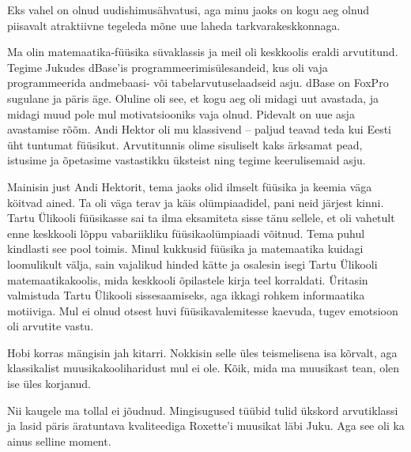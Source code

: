 
Eks vahel on olnud uudishimusähvatusi, aga minu jaoks on kogu aeg 
olnud piisavalt atraktiivne tegeleda mõne uue laheda 
tarkvarakeskkonnaga. 

Ma olin matemaatika-füüsika
süvaklassis ja meil oli keskkoolis eraldi arvutitund. Tegime Jukudes
dBase'is programmeerimisülesandeid, kus oli vaja programmeerida
andmebaasi- või tabelarvutuselaadseid asju. dBase on FoxPro 
sugulane ja päris äge. Oluline oli see, et 
kogu aeg oli midagi uut avastada, ja midagi muud pole mul motivatsiooniks vaja olnud. Pidevalt on uue 
asja avastamise rõõm. Andi Hektor oli mu 
klassivend -- paljud teavad teda kui Eesti üht tuntumat füüsikut. 
Arvutitunnis olime sisuliselt kaks ärksamat pead, istusime ja 
õpetasime vastastikku üksteist ning tegime keerulisemaid asju. 


Mainisin just Andi Hektorit, tema 
jaoks olid ilmselt füüsika ja keemia väga köitvad ained. Ta oli 
väga terav ja käis olümpiaadidel, pani neid järjest kinni. Tartu Ülikooli 
füüsikasse sai ta ilma eksamiteta sisse tänu sellele, et oli vahetult enne 
keskkooli lõppu vabariikliku füüsikaolümpiaadi võitnud. Tema puhul 
kindlasti see pool toimis. Minul kukkusid füüsika ja matemaatika kuidagi
loomulikult välja, sain vajalikud hinded kätte ja osalesin isegi 
Tartu Ülikooli matemaatikakoolis, mida keskkooli õpilastele 
kirja teel korraldati. Üritasin valmistuda Tartu 
Ülikooli sissesaamiseks, aga ikkagi rohkem informaatika motiiviga. Mul ei olnud
otsest huvi füüsikavalemitesse kaevuda, tugev emotsioon oli 
arvutite vastu. 


Hobi korras mängisin jah kitarri. Nokkisin selle üles 
teismelisena isa kõrvalt, aga klassikalist muusikakooliharidust mul ei 
ole. Kõik, mida ma muusikast tean, olen ise üles korjanud. 


Nii kaugele ma tollal ei jõudnud. Mingisugused tüübid tulid ükskord 
arvutiklassi ja lasid päris äratuntava 
kvaliteediga Roxette'i muusikat läbi Juku. Aga see oli ka ainus selline 
moment. 

